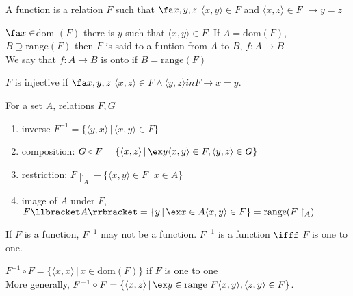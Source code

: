 \begin{definition}
    A function is a relation $F$ such that $\fa x, y, z$ $\langle x , y \rangle \in F$ and $\langle x , z \rangle \in F$ $\to y = z$ 
\end{definition}

\noindent
$\fa x \in $dom $(F)$ there is $y$ such that $\langle x , y \rangle \in F$. 
If $A = \text{dom}(F)$, $B \supseteq \text{range}(F)$ then $F$ is said to a funtion from $A$ to $B$, $f : A \to B$ \\
We say that $f:A \to B$ is onto if $B = \text{range}(F)$ 

\begin{definition}
    $F$ is injective if $\fa x, y, z$ $\langle x,z \rangle \in F \wedge \langle y, z \rangle in F \to x =y$. 
\end{definition}

\begin{definition}
    For a set $A$, relations $F, G$ 
    \begin{enumerate}[label = (\alph*)]
        \item inverse $F^{-1} = \{\langle y , x \rangle \, | \, \langle x, y \rangle \in F \}$ 
        \item composition: $G \circ F = \{ \langle x , z \rangle \, | \, \ex y \langle x, y \rangle \in F, \langle y , z \rangle \in G \}$
        \item restriction: $F \upharpoonright_A - \{\langle x, y \rangle \in F \, | \, x \in A \}$ 
        \item image of $A$ under $F$, $F \llbracket A \rrbracket = \{ y \, | \, \ex x \in A \langle x , y \rangle \in F\} = \text{range} (F \upharpoonright_A)$
    \end{enumerate}
\end{definition}

\begin{example}
    If $F$ is a function, $F^{-1}$ may not be a function. $F^{-1}$ is a function $\ifff$ $F$ is one to one. 
\end{example}

\begin{example}
    $F^{-1} \circ F = \{ \langle x , x \rangle \, | \, x \in \text{dom}(F) \}$ if $F$ is one to one \\
    More generally, $F^{-1} \circ F = \{ \langle x , z \rangle \, | \, \ex y  \in \text{range } F \langle x , y \rangle, \langle z , y \rangle \in F \}$. 
\end{example}